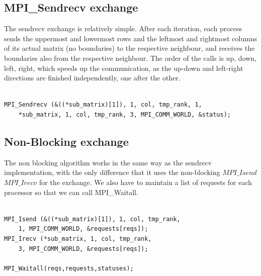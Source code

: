 \documentclass[11pt]{article}
\begin{document}
\subsection{MPI\_Sendrecv exchange}
The sendrecv exchange is relatively simple. After each iteration, each process sends the uppermost and lowermost rows and the leftmost and rightmost columns
of its actual matrix (no boundaries) to the respective neighbour, and receives the boundaries also from the respective neighbour. The order of the calls is
up, down, left, right, which speeds up the communication, as the up-down and left-right directions are finished independently, one after the other.\\
\begin{lstlisting}[label=some-code, caption=MPI\_Sendrecv left side call]

MPI_Sendrecv (&((*sub_matrix)[1]), 1, col, tmp_rank, 1,
    *sub_matrix, 1, col, tmp_rank, 3, MPI_COMM_WORLD, &status);

\end{lstlisting}

\subsection{Non-Blocking exchange}
The non blocking algorithm works in the same way as the sendrecv implementation, with the only difference that it uses the non-blocking $MPI\_Isend$
$MPI\_Irecv$ for the exchange. We also have to maintain a list of requests for each processor so that we can call MPI\_Waitall.
\begin{lstlisting}[label=some-code, caption=Non-blocking MPI left call + MPI\_Waitall]
      
MPI_Isend (&((*sub_matrix)[1]), 1, col, tmp_rank, 
    1, MPI_COMM_WORLD, &requests[reqs]);
MPI_Irecv (*sub_matrix, 1, col, tmp_rank, 
    3, MPI_COMM_WORLD, &requests[reqs]);

MPI_Waitall(reqs,requests,statuses);

\end{lstlisting}
\end{document}
